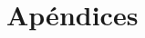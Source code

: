 \documentclass[12pt,a4paper]{book} %
\begin{document}
\part{Apéndices}

\appendix







\backmatter




\end{document}
